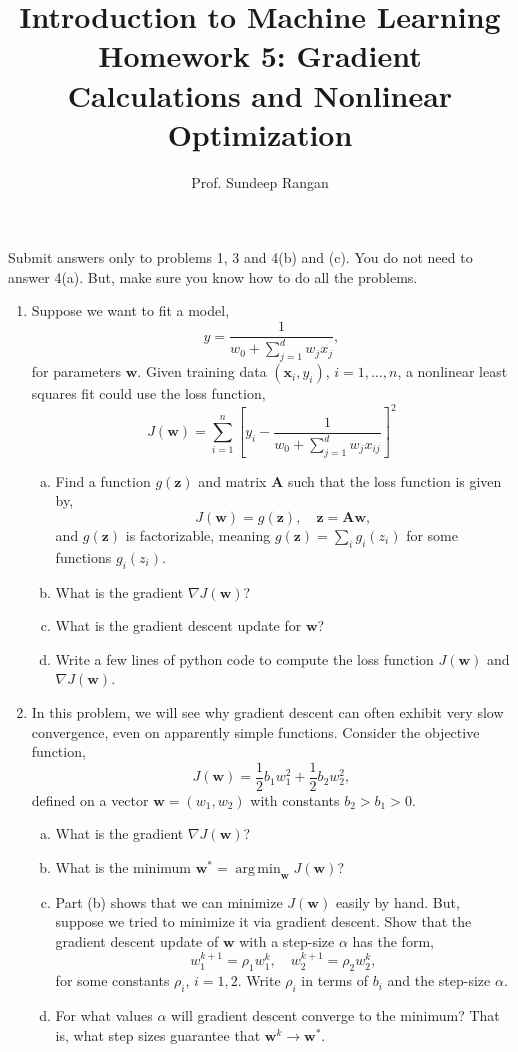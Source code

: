 \documentclass[11pt]{article}
\def\argmin{\mathop{\mathrm{arg\,min}}}
\def\arr{\rightarrow}
\newcommand{\wbf}{\mathbf{w}}
\newcommand{\xbf}{\mathbf{x}}
\newcommand{\zbf}{\mathbf{z}}
\newcommand{\Abf}{\mathbf{A}}
\begin{document}
\title{Introduction to Machine Learning\\
Homework 5:  Gradient Calculations and Nonlinear Optimization}
\author{Prof. Sundeep Rangan}
\date{}

\maketitle

Submit answers only to problems 1, 3 and 4(b) and (c).  You do not need to answer 4(a).
But, make sure you know how to do all the problems.

\begin{enumerate}

\item Suppose we want to fit a model,
\[
    \hat{y} = \frac{1}{w_0 + \sum_{j=1}^d w_jx_j},
\]
for parameters $\wbf$. Given training data $(\xbf_i,y_i)$, $i=1,\ldots,n$,
a nonlinear least squares fit could use the loss function,
\[
    J(\wbf) = \sum_{i=1}^n \left[y_i -
        \frac{1}{w_0 + \sum_{j=1}^d w_jx_{ij}}\right]^2
\]
\begin{enumerate}[(a)]
\item Find a function $g(\zbf)$ and matrix $\Abf$ such that
the loss function is given by,
\[
    J(\wbf) = g(\zbf), \quad \zbf = \Abf\wbf,
\]
and $g(\zbf)$ is factorizable, meaning $g(\zbf) = \sum_i g_i(z_i)$ for
some functions $g_i(z_i)$.

\item What is the gradient $\nabla J(\wbf)$?

\item What is the gradient descent update for $\wbf$?

\item Write a few lines of python code to compute the loss function $J(\wbf)$ and
$\nabla J(\wbf)$.
\end{enumerate}

\item In this problem, we will see why gradient descent can often exhibit
very slow convergence, even on apparently simple functions.
Consider the objective function,
\[
    J(\wbf) = \frac{1}{2}b_1w_1^2 + \frac{1}{2}b_2w_2^2,
\]
defined on a vector $\wbf=(w_1,w_2)$ with constants $b_2 > b_1 > 0$.
\begin{enumerate}[(a)]
  \item What is the gradient $\nabla J(\wbf)$?
  \item What is the minimum $\wbf^* = \argmin_{\wbf} J(\wbf)$?
  \item Part (b) shows that we can minimize $J(\wbf)$ easily by hand.
  But, suppose we tried to minimize it via gradient descent.
  Show that the gradient descent update of $\wbf$ with a step-size $\alpha$
has the form,
\[
    w_1^{k+1} = \rho_1 w_1^k, \quad w_2^{k+1} = \rho_2 w_2^k,
\]
for some constants $\rho_i$, $i=1,2$.  Write $\rho_i$ in terms of
$b_i$ and the step-size $\alpha$.
  \item For what values $\alpha$ will gradient descent converge to the minimum? That is, what step sizes guarantee that $\wbf^k \arr \wbf^*$.


\end{enumerate}
\end{enumerate}
\end{document}
